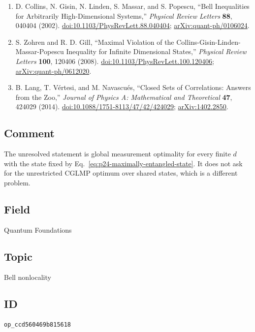 \begin{enumerate}[label={},leftmargin=4.8em,labelsep=0.5em]
  \footnotesize
  \item[\textup{[CGLMP02]}]\label{ref:p24-cglmp}
  D. Collins, N. Gisin, N. Linden, S. Massar, and S. Popescu,
  ``Bell Inequalities for Arbitrarily High-Dimensional Systems,''
  \emph{Physical Review Letters} \textbf{88}, 040404 (2002).
  \href{https://doi.org/10.1103/PhysRevLett.88.040404}{doi:10.1103/PhysRevLett.88.040404};
  \href{https://arxiv.org/abs/quant-ph/0106024}{arXiv:quant-ph/0106024}.

  \item[\textup{[ZG08]}]\label{ref:p24-zohren-gill}
  S. Zohren and R. D. Gill,
  ``Maximal Violation of the Collins-Gisin-Linden-Massar-Popescu Inequality
  for Infinite Dimensional States,''
  \emph{Physical Review Letters} \textbf{100}, 120406 (2008).
  \href{https://doi.org/10.1103/PhysRevLett.100.120406}{doi:10.1103/PhysRevLett.100.120406};
  \href{https://arxiv.org/abs/quant-ph/0612020}{arXiv:quant-ph/0612020}.

  \item[\textup{[LVN14]}]\label{ref:p24-lang}
  B. Lang, T. Vértesi, and M. Navascués,
  ``Closed Sets of Correlations: Answers from the Zoo,''
  \emph{Journal of Physics A: Mathematical and Theoretical} \textbf{47},
  424029 (2014).
  \href{https://doi.org/10.1088/1751-8113/47/42/424029}{doi:10.1088/1751-8113/47/42/424029};
  \href{https://arxiv.org/abs/1402.2850}{arXiv:1402.2850}.
\end{enumerate}

\subsection*{Comment}

The unresolved statement is global measurement optimality for every finite
$d$ with the state fixed by Eq.~\eqref{eq:p24-maximally-entangled-state}.  It
does not ask for the unrestricted CGLMP optimum over shared states, which is a
different problem.

\subsection*{Field}

Quantum Foundations

\subsection*{Topic}

Bell nonlocality

\subsection*{ID}

\texttt{op\_ccd560469b815618}
